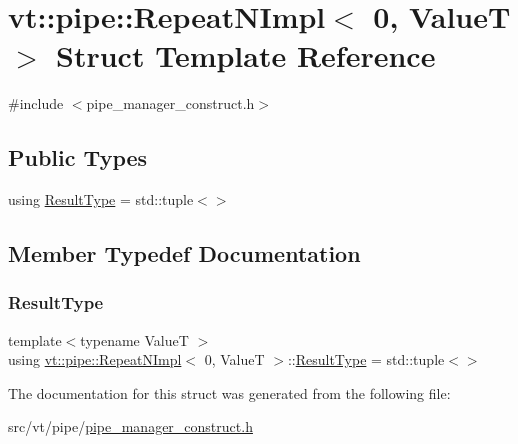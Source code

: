 \hypertarget{structvt_1_1pipe_1_1_repeat_n_impl_3_010_00_01_value_t_01_4}{}\section{vt\+:\+:pipe\+:\+:Repeat\+N\+Impl$<$ 0, ValueT $>$ Struct Template Reference}
\label{structvt_1_1pipe_1_1_repeat_n_impl_3_010_00_01_value_t_01_4}


{\ttfamily \#include $<$pipe\+\_\+manager\+\_\+construct.\+h$>$}

\subsection*{Public Types}
\begin{DoxyCompactItemize}
\item 
using \hyperlink{structvt_1_1pipe_1_1_repeat_n_impl_3_010_00_01_value_t_01_4_a054affc6345c29e36b3b05a298d4df04}{Result\+Type} = std\+::tuple$<$$>$
\end{DoxyCompactItemize}


\subsection{Member Typedef Documentation}
\mbox{\label{structvt_1_1pipe_1_1_repeat_n_impl_3_010_00_01_value_t_01_4_a054affc6345c29e36b3b05a298d4df04}} 
\subsubsection{\texorpdfstring{Result\+Type}{ResultType}}
{\footnotesize\ttfamily template$<$typename ValueT $>$ \\
using \hyperlink{structvt_1_1pipe_1_1_repeat_n_impl}{vt\+::pipe\+::\+Repeat\+N\+Impl}$<$ 0, ValueT $>$\+::\hyperlink{structvt_1_1pipe_1_1_repeat_n_impl_3_010_00_01_value_t_01_4_a054affc6345c29e36b3b05a298d4df04}{Result\+Type} =  std\+::tuple$<$$>$}



The documentation for this struct was generated from the following file\+:\begin{DoxyCompactItemize}
\item 
src/vt/pipe/\hyperlink{pipe__manager__construct_8h}{pipe\+\_\+manager\+\_\+construct.\+h}\end{DoxyCompactItemize}
